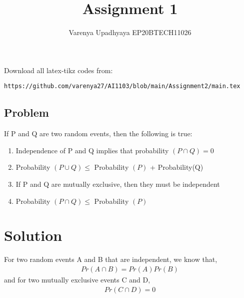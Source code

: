 \documentclass[journal,12pt,twocolumn]{IEEEtran}
\title{Assignment 1}
\author{Varenya Upadhyaya EP20BTECH11026}
\date{}
\begin{document}
\maketitle
Download all latex-tikz codes from:
\begin{lstlisting}
https://github.com/varenya27/AI1103/blob/main/Assignment2/main.tex
\end{lstlisting}
\maketitle   
\begin{center}
\section*{\textbf{Problem}}
\end{center}
If P and Q are two random events, then the following is true:
\begin{enumerate}[label = (\alph*)]
    \item Independence of P and Q implies that probability $(P\cap Q)=0 $ 
    \item Probability $(P\cup Q) \leq   $ Probability $(P)$ + Probability(Q) 
    \item If P and Q are mutually exclusive, then they must be independent
    \item Probability $(P\cap Q) \leq$ Probability $(P)$
\end{enumerate}
\maketitle
\section*{\textbf{Solution}}
For two random events A and B that are independent, we know that, 
\begin{align}
Pr(A\cap B) = Pr(A)Pr(B)
\end{align}
and for two mutually exclusive events C and D, 
\begin{align}
    Pr(C\cap D) = 0
\end{align}
\end{document}
